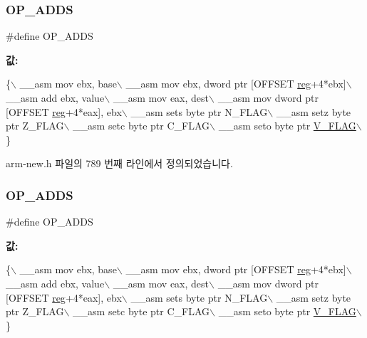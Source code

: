 \subsubsection{\texorpdfstring{O\+P\+\_\+\+A\+D\+DS}{OP\_ADDS}\hspace{0.1cm}{\footnotesize\ttfamily [1/2]}}
{\footnotesize\ttfamily \#define O\+P\+\_\+\+A\+D\+DS}

{\bfseries 값\+:}
\begin{DoxyCode}
\{\(\backslash\)
        \_\_asm mov ebx, base\(\backslash\)
        \_\_asm mov ebx, dword ptr [OFFSET \mbox{\hyperlink{_g_b_a_8h_ae29faba89509024ffd1a292badcedf2d}{reg}}+4*ebx]\(\backslash\)
        \_\_asm add ebx, value\(\backslash\)
        \_\_asm mov eax, dest\(\backslash\)
        \_\_asm mov dword ptr [OFFSET \mbox{\hyperlink{_g_b_a_8h_ae29faba89509024ffd1a292badcedf2d}{reg}}+4*eax], ebx\(\backslash\)
        \_\_asm sets byte ptr N\_FLAG\(\backslash\)
        \_\_asm setz byte ptr Z\_FLAG\(\backslash\)
        \_\_asm setc byte ptr C\_FLAG\(\backslash\)
        \_\_asm seto byte ptr \mbox{\hyperlink{_g_b_a_8h_a11a0e7b14a93be5eb2720b0151900919}{V\_FLAG}}\(\backslash\)
      \}
\end{DoxyCode}


arm-\/new.\+h 파일의 789 번째 라인에서 정의되었습니다.

\mbox{\label{_g_b_a_8cpp_a65004b5c348ae16b8a2b8e0b9f02b9d4}} 
\subsubsection{\texorpdfstring{O\+P\+\_\+\+A\+D\+DS}{OP\_ADDS}\hspace{0.1cm}{\footnotesize\ttfamily [2/2]}}
{\footnotesize\ttfamily \#define O\+P\+\_\+\+A\+D\+DS}

{\bfseries 값\+:}
\begin{DoxyCode}
\{\(\backslash\)
        \_\_asm mov ebx, base\(\backslash\)
        \_\_asm mov ebx, dword ptr [OFFSET \mbox{\hyperlink{_g_b_a_8h_ae29faba89509024ffd1a292badcedf2d}{reg}}+4*ebx]\(\backslash\)
        \_\_asm add ebx, value\(\backslash\)
        \_\_asm mov eax, dest\(\backslash\)
        \_\_asm mov dword ptr [OFFSET \mbox{\hyperlink{_g_b_a_8h_ae29faba89509024ffd1a292badcedf2d}{reg}}+4*eax], ebx\(\backslash\)
        \_\_asm sets byte ptr N\_FLAG\(\backslash\)
        \_\_asm setz byte ptr Z\_FLAG\(\backslash\)
        \_\_asm setc byte ptr C\_FLAG\(\backslash\)
        \_\_asm seto byte ptr \mbox{\hyperlink{_g_b_a_8h_a11a0e7b14a93be5eb2720b0151900919}{V\_FLAG}}\(\backslash\)
      \}
\end{DoxyCode}
\mbox{\label{arm-new_8h_ac56577e3b08d3c7453db5d81d96bf05b}} 
